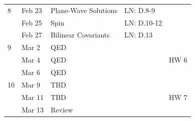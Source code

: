 \documentclass[12pt]{article}
\begin{document}
\begin{tabular}{lllll}
\hline
8  & Feb 23  & Plane-Wave Solutions              & LN: D.8-9 & \\ 
   & Feb 25  & Spin                              & LN: D.10-12 & \\
   & Feb 27  & Bilinear Covariants               & LN: D.13 & \\
\hline
9  & Mar 2   & QED                               & \\
   & Mar 4   & QED                               & & HW 6\\
   & Mar 6   & QED                               & \\
\hline
10 & Mar 9   & TBD                               & \\
   & Mar 11  & TBD                               & & HW 7\\
   & Mar 13  & Review                            & \\
\hline
\end{tabular}\\
\end{document}
